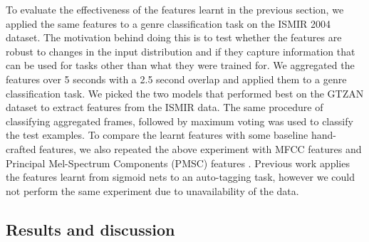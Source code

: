 \documentclass{article}
\begin{document}
To evaluate the effectiveness of the features learnt in the previous section, we applied the same features to a genre classification task on the ISMIR 2004 dataset. The motivation behind doing this is to test whether the features are robust to changes in the input distribution and if they capture information that can be used for tasks other than what they were trained for. We aggregated the features over 5 seconds with a 2.5 second overlap and applied them to a genre classification task. We picked the two models that performed best on the GTZAN dataset to extract features from the ISMIR data. The same procedure of classifying aggregated frames, followed by maximum voting was used to classify the test examples. To compare the learnt features with some baseline hand-crafted features, we also repeated the above experiment with MFCC features and Principal Mel-Spectrum Components (PMSC) features \cite{hamel2011temporal}. Previous work \cite{hamel2010learning} applies the features learnt from sigmoid nets to an auto-tagging task, however we could not perform the same experiment due to unavailability of the data.   
\begin{center}
\begin{table}
\caption{Genre classification results on the ISMIR 2004 dataset}
\vspace{-0.8em}
\end{table}  
\end{center}

\vspace{-3em}
\subsection{Results and discussion}
\end{document}
